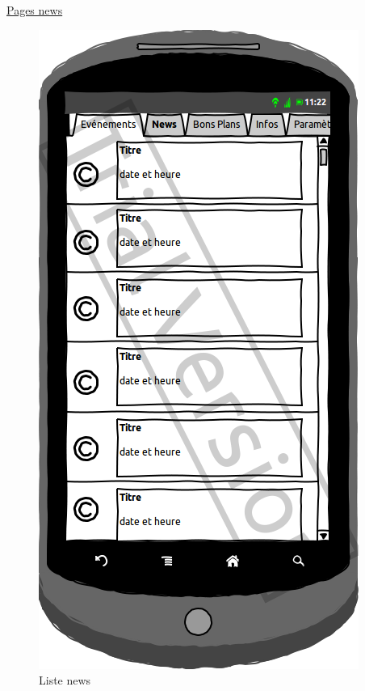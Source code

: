 \documentclass[a4paper, 11pt]{article}
\begin{document}
\underline{Pages news}\\
\begin{figure}[h!]
	\begin{minipage}[c]{.50\linewidth}
		\begin{center}
			\includegraphics[scale=0.3]{../../Sketch/Android/News.png}
		\end{center}
	\caption{Liste news}
	\end{minipage}
	\hfill
	\begin{minipage}[c]{.50\linewidth}
		\begin{center}

\end{center}
\end{minipage}
\end{figure}
\end{document}
